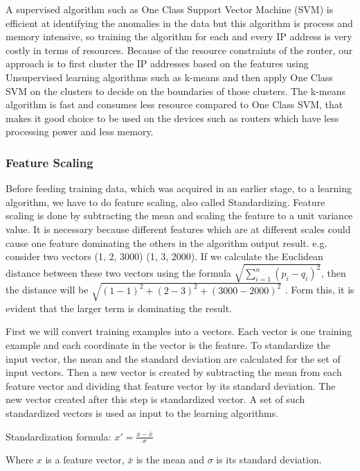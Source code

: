 \documentclass[12pt,oneside,a4paper]{article}
\begin{document}
A supervised algorithm such as One Class Support Vector Machine (SVM)\cite{svm} is efficient at identifying the anomalies in the data but this algorithm is process and memory intensive, so training the algorithm for each and every IP address is very costly in terms of resources. Because of the resource constraints of the router, our approach is to first cluster the IP addresses based on the features using Unsupervised learning algorithms such as k-means and then apply One Class SVM on the clusters to decide on the boundaries of those clusters. The k-means algorithm is fast and consumes less resource compared to One Class SVM, that makes it good choice to be used on the devices such as routers which have less processing power and less memory.

\subsubsection{Feature Scaling}

Before feeding training data, which was acquired in an earlier stage, to a learning algorithm, we have to do feature scaling, also called Standardizing. Feature scaling is done by subtracting the mean and scaling the feature to a unit variance value. It is necessary because  different features which are at different scales could cause one feature dominating the others in the algorithm output result. e.g. consider two vectors (1, 2, 3000) (1, 3, 2000). If we calculate the Euclidean distance between these two vectors using the formula $\sqrt{\sum_{i=1}^n (p_i - q_i)^2}$, then the distance will be $\sqrt{(1-1)^2 + (2-3)^2 + (3000-2000)^2}$ . Form this, it is evident that the larger term is dominating the result.

First we will convert training examples into a vectors. Each vector is one training example and each coordinate in the vector is the feature. To standardize the input vector, the mean and the standard deviation are calculated for the set of input vectors. Then a new vector is created by subtracting the mean from each feature vector and dividing that feature vector by its standard deviation. The new vector created after this step is standardized vector. A set of such standardized vectors is used as input to the learning algorithms.

\hspace{2cm} Standardization formula: $x' = \frac{x - \bar{x}}{\sigma}$

Where $x$ is a feature vector, ${\bar{x}}$ is the mean and $\sigma$  is its standard deviation.
\end{document}
